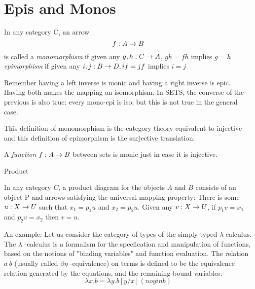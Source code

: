 
\section{Epis and Monos}

\begin{definition}

  In any category C, an arrow $$ f : A \rightarrow B $$ is
  called a \textit{monomorphism} if given any $ g, h : C \rightarrow A$,
  $gh = fh$ implies $g = h$ \\

  \textit{epimorphism} if given any $i,j : B \rightarrow D, if = jf$ implies $i = j$


\end{definition}

Remember having a left inverse is monic and having a right inverse is epic. Having both makes the mapping an isomorphism. In SETS, the converse of the previous is also true: every mono-epi is iso; but this is not true in the general case.

This definition of monomorphism is the category theory equivalent to injective and this definition of epimorphism is the surjective translation.


\begin{proposition}

  A \textit{function} $ f : A \rightarrow B$ between sets is monic just in case it is injective. 
  
\end{proposition}



\begin{definition}{Product}

  In any category $C$, a product diagram for the objects $A$ and $B$
  consists of an object P and arrows
satisfying the universal mapping property: There is some $u: X \rightarrow U$
such that $x_1 = p_1u$ and $x_2 = p_{2}u$. Given any $v: X \rightarrow U$, if
$p_{1}v = x_1$ and $p_{2}v = x_2$ then $v = u$.
\end{definition}

An example:
Let us consider the category of types of the simply typed $\lambda$-calculus.
The $\lambda$ -calculus is a formalism for the specfication and manipulation of functions, based
on the notions of "binding variables" and function evaluation. The relation $ a ~ b $
(usually called $\beta\eta$ -equivalence) on terms is defined to be the equivalence relation
generated by the equations, and the remaining bound variables:
$$ \lambda x.b = \lambda y.b [y/x] (no y in b) $$

